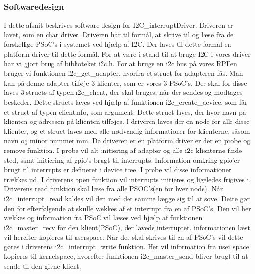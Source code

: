 \documentclass[Rapport/RPi/RPI.tex]{subfiles}
\begin{document}
\subsubsection{Softwaredesign}
I dette afsnit beskrives software design for I2C\_interruptDriver. Driveren er lavet, som en char driver. Driveren har til formål, at skrive til og læse fra de forskellige PSoC's i systemet ved hjælp af I2C. Der laves til dette formål en platform driver til dette formål. For at være i stand til at bruge I2C i vores driver har vi gjort brug af biblioteket i2c.h. For at bruge en i2c bus på vores RPI'en bruger vi funktionen i2c\_get\_adapter, hvorfra et struct for adapteren fås. Man kan på denne adapter tilføje 3 klienter, som er vores 3 PSoC's. Der skal for disse laves 3 structs af typen i2c\_client, der skal bruges, når der sendes og modtages beskeder. Dette structs laves ved hjælp af funktionen i2c\_create\_device, som får et struct af typen clientinfo, som argument. Dette struct laves, der hvor navn på klienten og adressen på klienten tilføjes. I driveren laves der en node for alle disse klienter, og et struct laves med alle nødvendig informationer for klienterne, såsom navn og minor nummer mm. Da driveren er en platform driver er der en probe og remove funktion. I probe vil alt initiering af adapter og alle i2c klienterne finde sted, samt initiering af gpio's brugt til interrupts. Information omkring gpio'er brugt til interrupts er defineret i device tree. I probe vil disse informationer trækkes ud. I driverens open funktion vil interrupts initieres og ligeledes frigives i. Driverens read funktion skal læse fra alle PSOC's(en for hver node). Når i2c\_interrupt\_read kaldes vil den med det samme lægge sig til at sove. Dette gør den for efterfølgende at skulle vækkes af et interrupt fra en af PSoC's. Den vil her vækkes og information fra PSoC vil læses ved hjælp af funktionen i2c\_master\_recv for den klient(PSoC), der lavede interruptet. informationen læst vil herefter kopieres til userspace. 
Når der skal skrives til en af PSoC's vil dette gøres i driverens i2c\_interrupt\_write funktion. Her vil information fra user space kopieres til kernelspace, hvorefter funktionen i2c\_master\_send bliver brugt til at sende til den givne klient.
\end{document}
